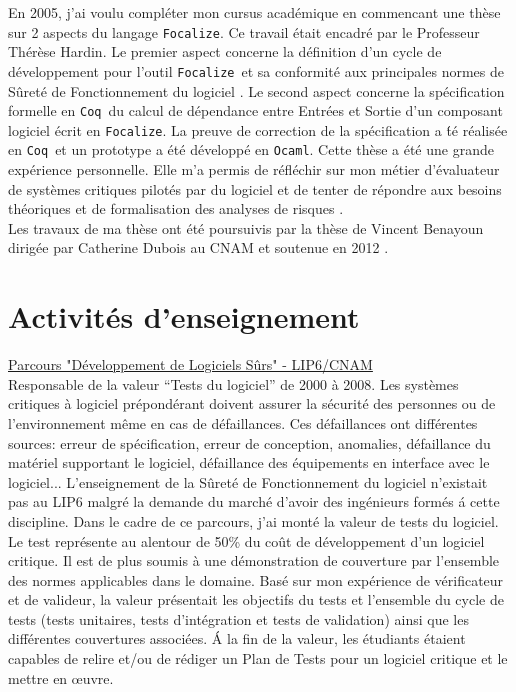 \documentclass[a4paper,12pt]{article}
\newcommand{\Coq}{{\tt Coq}}
\newcommand{\Ocaml}{{\tt Ocaml}}
\newcommand{\Focal}{{\tt Focalize}}
\newcommand{\smallspace}{\vspace{0.25cm}}
\begin{document}
\smallspace
En 2005, j'ai voulu compl\'eter mon cursus acad\'emique en
commencant une th\`ese sur 2 aspects du langage \Focal. Ce travail
\'etait encadr\'e par le Professeur Th\'er\`ese Hardin. Le premier
aspect concerne la d\'efinition d'un cycle de d\'eveloppement pour
l'outil \Focal\ et sa conformit\'e aux principales normes de
S\^uret\'e de Fonctionnement du logiciel \cite{TAP09, TTSS08}. Le
second aspect concerne la sp\'ecification formelle en \Coq\ du calcul
de d\'ependance entre Entr\'ees et Sortie d'un composant logiciel
\'ecrit en \Focal. La preuve de correction de la sp\'ecification a
\'t\'e r\'ealis\'ee en \Coq\ et un prototype a \'et\'e d\'evelopp\'e
en \Ocaml. Cette th\`ese a \'et\'e une grande exp\'erience
personnelle. Elle m'a permis de r\'efl\'echir sur mon m\'etier
d'\'evaluateur de syst\`emes critiques pilot\'es par du logiciel et de
tenter de r\'epondre aux besoins th\'eoriques et de formalisation des
analyses de risques \cite{Phd-PAyrault}.
\\
Les travaux de ma th\`ese ont \'et\'e poursuivis par la th\`ese de Vincent
Benayoun dirig\'ee par Catherine Dubois au CNAM et soutenue en 2012
\cite{Phd-VBenayoun, SEFM2012}.

\section{Activit\'es d'enseignement}
\hspace{-0.6cm}\underline{Parcours "D\'eveloppement de Logiciels
  S\^urs" - LIP6/CNAM}
\\
Responsable de la valeur ``Tests du logiciel'' de 2000 \`a
2008.  Les syst\`emes critiques \`a logiciel pr\'epond\'erant doivent 
assurer la s\'ecurit\'e des personnes ou de l'environnement m\^eme en cas 
de d\'efaillances. Ces d\'efaillances ont diff\'erentes sources: erreur de 
sp\'ecification, erreur de conception, anomalies, d\'efaillance du
mat\'eriel supportant le logiciel, d\'efaillance des \'equipements en
interface avec le logiciel... L'enseignement de la S\^uret\'e de
Fonctionnement du logiciel n'existait pas au LIP6 malgr\'e la demande
du march\'e d'avoir des ing\'enieurs form\'es \'a cette discipline.
Dans le cadre de ce parcours, j'ai mont\'e la valeur de tests du
logiciel. Le test repr\'esente au alentour de 50\% du co\^ut de
d\'eveloppement d'un logiciel critique. Il est de plus soumis \`a une
d\'emonstration de couverture par l'ensemble des normes applicables dans
le domaine. Bas\'e sur mon exp\'erience de v\'erificateur et de
valideur, la valeur pr\'esentait les objectifs du tests et l'ensemble
du cycle de tests (tests unitaires, tests d'int\'egration et tests de
validation) ainsi que les diff\'erentes couvertures associ\'ees.
\'A la fin de la valeur, les \'etudiants \'etaient capables de relire
et/ou de r\'ediger un Plan de Tests pour un logiciel critique et le
mettre en \oe{}uvre.
  
\end{document}
